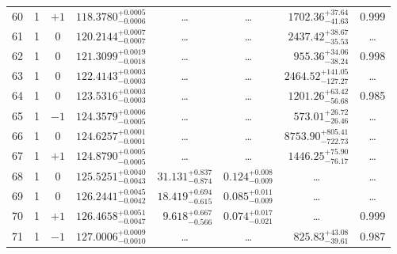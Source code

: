 \begin{table*}[!]
\begin{tabular}{llcrrlrc}
60 & 1 & $+1$ & $    118.3780_{-      0.0006}^{+      0.0005}$ & \multicolumn{1}{c}{\dots} & \multicolumn{1}{c}{\dots} & $     1702.36_{-       41.63}^{+       37.64}$ & 0.999\\[1pt]
61 & 1 & 0 & $    120.2144_{-      0.0007}^{+      0.0007}$ & \multicolumn{1}{c}{\dots} & \multicolumn{1}{c}{\dots} & $     2437.42_{-       35.53}^{+       38.67}$ & \dots\\[1pt]
62 & 1 & 0 & $    121.3099_{-      0.0018}^{+      0.0019}$ & \multicolumn{1}{c}{\dots} & \multicolumn{1}{c}{\dots} & $      955.36_{-       38.24}^{+       34.06}$ & 0.998\\[1pt]

63 & 1 & 0 & $    122.4143_{-      0.0003}^{+      0.0003}$ & \multicolumn{1}{c}{\dots} & \multicolumn{1}{c}{\dots} & $     2464.52_{-      127.27}^{+      141.05}$ & \dots\\[1pt]
64 & 1 & 0 & $    123.5316_{-      0.0003}^{+      0.0003}$ & \multicolumn{1}{c}{\dots} & \multicolumn{1}{c}{\dots} & $     1201.26_{-       56.68}^{+       63.42}$ & 0.985\\[1pt]
65 & 1 & $-1$ & $    124.3579_{-      0.0005}^{+      0.0006}$ & \multicolumn{1}{c}{\dots} & \multicolumn{1}{c}{\dots} & $      573.01_{-       26.46}^{+       26.72}$ & \dots\\[1pt]
66 & 1 & 0 & $    124.6257_{-      0.0001}^{+      0.0001}$ & \multicolumn{1}{c}{\dots} & \multicolumn{1}{c}{\dots} & $     8753.90_{-      722.73}^{+      805.41}$ & \dots\\[1pt]
67 & 1 & $+1$ & $    124.8790_{-      0.0005}^{+      0.0005}$ & \multicolumn{1}{c}{\dots} & \multicolumn{1}{c}{\dots} & $     1446.25_{-       76.17}^{+       75.90}$ & \dots\\[1pt]
68 & 1 & 0 & $    125.5251_{-      0.0043}^{+      0.0040}$ & $      31.131_{-       0.874}^{+       0.837}$ & $       0.124_{-       0.009}^{+       0.008}$ & \multicolumn{1}{c}{\dots} & \dots\\[1pt]
69 & 1 & 0 & $    126.2441_{-      0.0042}^{+      0.0045}$ & $      18.419_{-       0.615}^{+       0.694}$ & $       0.085_{-       0.009}^{+       0.011}$ & \multicolumn{1}{c}{\dots} & \dots \\[1pt]
70 & 1 & $+1$ & $    126.4658_{-      0.0047}^{+      0.0051}$ & $       9.618_{-       0.566}^{+       0.667}$ & $       0.074_{-       0.021}^{+       0.017}$ & \multicolumn{1}{c}{\dots} & 0.999\\[1pt]
71 & 1 & $-1$ & $    127.0006_{-      0.0010}^{+      0.0009}$ & \multicolumn{1}{c}{\dots} & \multicolumn{1}{c}{\dots} & $      825.83_{-       39.61}^{+       43.08}$ & 0.987\\[1pt]

\end{tabular}
\end{table*}
